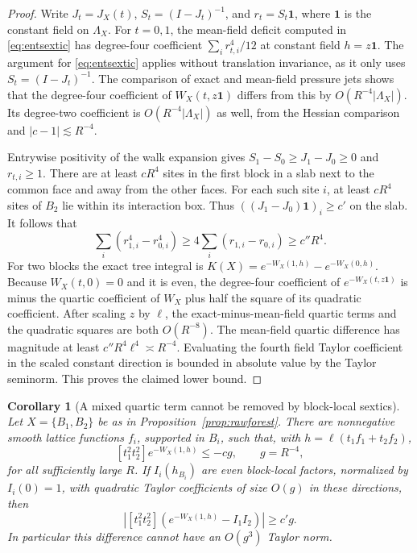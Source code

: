\documentclass[11pt]{article}
\newtheorem{corollary}[proposition]{Corollary}
\begin{document}
\begin{proof}
Write \(J_t=J_X(t)\), \(S_t=(I-J_t)^{-1}\), and
\(r_t=S_t\boldsymbol 1\), where \(\boldsymbol 1\) is the constant
field on \(\Lambda_X\). For \(t=0,1\), the mean-field deficit
computed in \eqref{eq:entsextic} has degree-four coefficient
\(\sum_i r_{t,i}^4/12\) at constant field \(h=z\boldsymbol 1\).
The argument for \eqref{eq:entsextic} applies without translation
invariance, as it only uses \(S_t=(I-J_t)^{-1}\). The comparison
of exact and mean-field pressure jets shows that the degree-four
coefficient of \(W_X(t,z\boldsymbol 1)\) differs from this by
\(O(R^{-4}|\Lambda_X|)\). Its degree-two coefficient is
\(O(R^{-4}|\Lambda_X|)\) as well, from the Hessian comparison and
\(|c-1|\lesssim R^{-4}\).

Entrywise positivity of the walk expansion gives
\(S_1-S_0\ge J_1-J_0\ge0\) and \(r_{t,i}\ge1\). There are at least
\(cR^4\) sites in the first block in a slab next to the common face
and away from the other faces. For each such site \(i\), at least
\(cR^4\) sites of \(B_2\) lie within its interaction box. Thus
\(((J_1-J_0)\boldsymbol 1)_i\ge c'\) on the slab. It follows that
\[
 \sum_i(r_{1,i}^4-r_{0,i}^4)\ge4\sum_i(r_{1,i}-r_{0,i})\ge c''R^4.
\]
For two blocks the exact tree integral is
\(K(X)=e^{-W_X(1,h)}-e^{-W_X(0,h)}\). Because \(W_X(t,0)=0\)
and it is even, the degree-four coefficient of \(e^{-W_X(t,z\boldsymbol1)}\)
is minus the quartic coefficient of \(W_X\) plus half the square
of its quadratic coefficient. After scaling \(z\) by \(\ell\),
the exact-minus-mean-field quartic terms and the quadratic squares
are both \(O(R^{-8})\). The mean-field quartic difference has
magnitude at least \(c''R^4\ell^4\asymp R^{-4}\). Evaluating the
fourth field Taylor coefficient in the scaled constant direction
is bounded in absolute value by the Taylor seminorm. This proves
the claimed lower bound.
\end{proof}

\begin{corollary}[A mixed quartic term cannot be removed by block-local sextics]
Let \(X=\{B_1,B_2\}\) be as in Proposition~\ref{prop:rawforest}.
There are nonnegative smooth lattice functions \(f_i\), supported
in \(B_i\), such that, with \(h=\ell(t_1f_1+t_2f_2)\),
\[
 [t_1^2t_2^2]e^{-W_X(1,h)}\le -c g,
 \qquad g=R^{-4},
\]
for all sufficiently large \(R\). If \(I_i(h_{B_i})\) are even
block-local factors, normalized by \(I_i(0)=1\), with quadratic
Taylor coefficients of size \(O(g)\) in these directions, then
\[
 \left|[t_1^2t_2^2]\left(e^{-W_X(1,h)}-I_1I_2\right)\right|
 \ge c' g.
\]
In particular this difference cannot have an \(O(g^3)\) Taylor norm.
\end{corollary}
\end{document}
